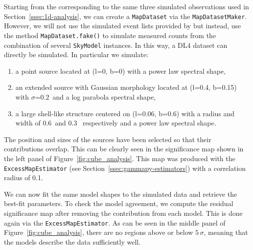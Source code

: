 \documentclass[longauth]{aa}
\newcommand{\code}[1]{\texttt{#1}}
\begin{document}
Starting from the \irfs corresponding to the same three simulated \cta
observations used in Section~\ref{ssec:1d-analysis}, we can create a \code{MapDataset}
via the \code{MapDatasetMaker}. However, we will not use the simulated event lists
provided by \cta but instead, use the method \code{MapDataset.fake()} to simulate
measured counts from the combination of several \code{SkyModel} instances. In this
way, a DL4 dataset can directly be simulated. In particular we simulate:
\begin{enumerate}
    \item a point source located at (l=0\textdegree, b=0\textdegree) with a power law
	      spectral shape,
    \item an extended source with Gaussian morphology located at (l=0.4\textdegree,
	      b=0.15\textdegree) with $\sigma$=0.2\textdegree~and a log parabola spectral
	      shape,
    \item a large shell-like structure centered on (l=0.06\textdegree,
	      b=0.6\textdegree) with a radius and width of 0.6\textdegree~and 0.3\textdegree~
	      respectively and a power law spectral shape.
\end{enumerate}

The position and sizes of the sources
have been selected so that their contributions overlap. This can be clearly
seen in the significance map shown in the left panel of
Figure~\ref{fig:cube_analysis}. This map was produced with the
\code{ExcessMapEstimator} (see Section~\ref{ssec:gammapy-estimators}) with a
correlation radius of 0.1\textdegree.

We can now fit the same model shapes to the simulated data and retrieve the
best-fit parameters. To check the model agreement, we compute the residual
significance map after removing the contribution from each model. This is done
again via the \code{ExcessMapEstimator}. As can be seen in the middle panel of
Figure~\ref{fig:cube_analysis}, there are no regions above or below $5\,\sigma$,
meaning that the models describe the data sufficiently well.
\end{document}
